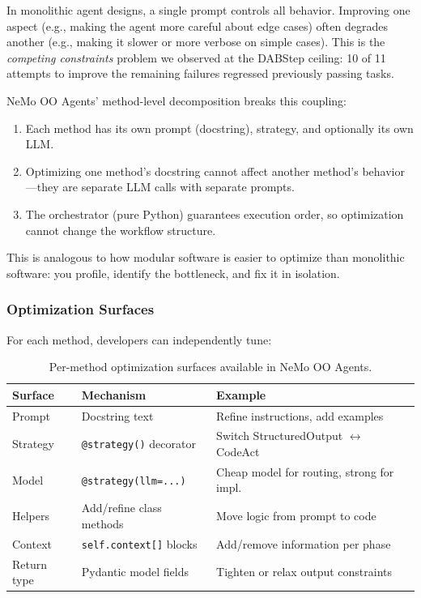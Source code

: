 \documentclass[11pt, logo, onecolumn, copyright, colorlinks=true, allcolors=blue]{nvidiatechreport}
\begin{document}
In monolithic agent designs, a single prompt controls all behavior. Improving
one aspect (e.g., making the agent more careful about edge cases) often degrades
another (e.g., making it slower or more verbose on simple cases). This is the
\emph{competing constraints} problem we observed at the DABStep ceiling: 10 of
11 attempts to improve the remaining failures regressed previously passing tasks.

NeMo OO Agents' method-level decomposition breaks this coupling:

\begin{enumerate}
  \item Each method has its own prompt (docstring), strategy, and optionally
        its own LLM.
  \item Optimizing one method's docstring cannot affect another method's behavior
        ---they are separate LLM calls with separate prompts.
  \item The orchestrator (pure Python) guarantees execution order, so
        optimization cannot change the workflow structure.
\end{enumerate}

This is analogous to how modular software is easier to optimize than monolithic
software: you profile, identify the bottleneck, and fix it in isolation.

\subsubsection{Optimization Surfaces}
\label{sec:optimization:surfaces}

For each method, developers can independently tune:

\begin{table}[h]
\centering
\caption{Per-method optimization surfaces available in NeMo OO Agents.}
\label{tab:optimization-surfaces}
\begin{tabular}{lll}
\toprule
\textbf{Surface} & \textbf{Mechanism} & \textbf{Example} \\
\midrule
Prompt & Docstring text & Refine instructions, add examples \\
Strategy & \texttt{@strategy()} decorator & Switch StructuredOutput $\leftrightarrow$ CodeAct \\
Model & \texttt{@strategy(llm=...)} & Cheap model for routing, strong for impl. \\
Helpers & Add/refine class methods & Move logic from prompt to code \\
Context & \texttt{self.context[]} blocks & Add/remove information per phase \\
Return type & Pydantic model fields & Tighten or relax output constraints \\
\bottomrule
\end{tabular}
\end{table}
\end{document}
